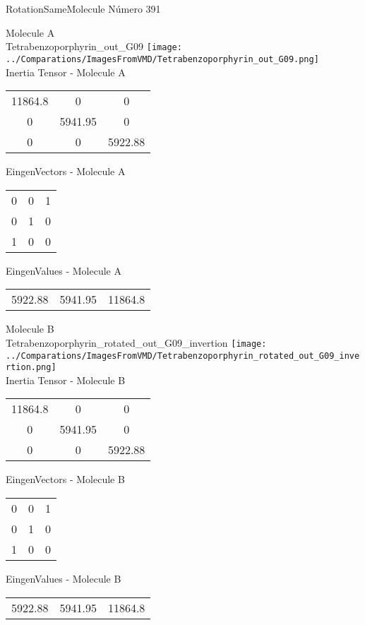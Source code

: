  \newpage

\vtab[-2cm]
\begin{center}
{\large RotationSameMolecule \tab Número 391}
\end{center}
\begin{multicols}{2}
\begin{center}

Molecule A \\ 
Tetrabenzoporphyrin\_out\_G09
\texttt{[image: ../Comparations/ImagesFromVMD/Tetrabenzoporphyrin\_out\_G09.png]}
\\
Inertia Tensor - Molecule A \\
\vtab

\begin{tabular}{|c c c|}
11864.8	 & 	0	 & 	0	 \\
0	 & 	5941.95	 & 	0	 \\
0	 & 	0	 & 	5922.88
\end{tabular}

\vtab
 EingenVectors - Molecule A     \\
\vtab
\begin{tabular}{|c c c|}
0	 & 	0	 & 	1	 \\
0	 & 	1	 & 	0	 \\
1	 & 	0	 & 	0
\end{tabular}

\vtab
 EingenValues - Molecule A     \\
\vtab
\begin{tabular}{|c c c|}
5922.88	 & 	5941.95	 & 	11864.8	 \\
\end{tabular}
\columnbreak

Molecule B \\ 
Tetrabenzoporphyrin\_rotated\_out\_G09\_invertion
\texttt{[image: ../Comparations/ImagesFromVMD/Tetrabenzoporphyrin\_rotated\_out\_G09\_invertion.png]}
\\
Inertia Tensor - Molecule B \\
\vtab

\begin{tabular}{|c c c|}
11864.8	 & 	0	 & 	0	 \\
0	 & 	5941.95	 & 	0	 \\
0	 & 	0	 & 	5922.88
\end{tabular}

\vtab
 EingenVectors - Molecule B     \\
\vtab
\begin{tabular}{|c c c|}
0	 & 	0	 & 	1	 \\
0	 & 	1	 & 	0	 \\
1	 & 	0	 & 	0
\end{tabular}

\vtab
 EingenValues - Molecule B     \\
\vtab
\begin{tabular}{|c c c|}
5922.88	 & 	5941.95	 & 	11864.8	 \\
\end{tabular}

\end{center}
\end{multicols}
